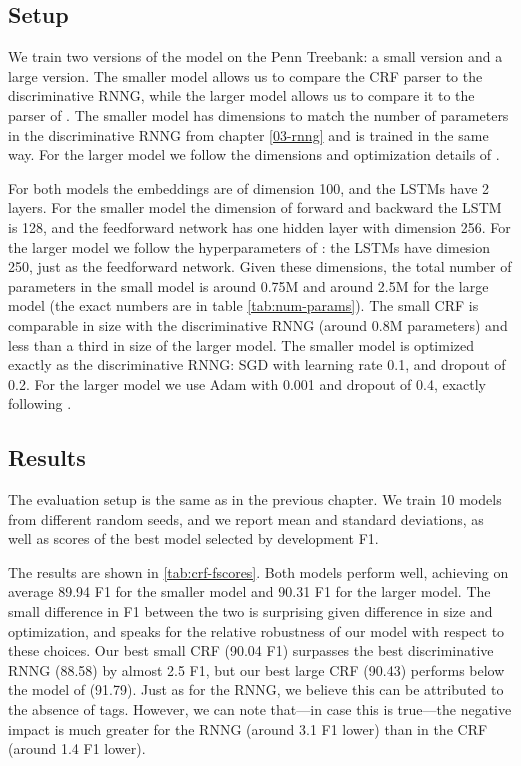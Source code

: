  \subsection{Setup}
    We train two versions of the model on the Penn Treebank: a small version and a large version. The smaller model allows us to compare the CRF parser to the discriminative RNNG, while the larger model allows us to compare it to the parser of \citet{stern2017minimal}. The smaller model has dimensions to match the number of parameters in the discriminative RNNG from chapter \ref{03-rnng} and is trained in the same way. For the larger model we follow the dimensions and optimization details of \citet{stern2017minimal}.

    For both models the embeddings are of dimension 100, and the LSTMs have 2 layers. For the smaller model the dimension of forward and backward the LSTM is 128, and the feedforward network has one hidden layer with dimension 256. For the larger model we follow the hyperparameters of \citet{stern2017minimal}: the LSTMs have dimesion 250, just as the feedforward network. Given these dimensions, the total number of parameters in the small model is around 0.75M and around 2.5M for the large model (the exact numbers are in table \ref{tab:num-params}). The small CRF is comparable in size with the discriminative RNNG (around 0.8M parameters) and less than a third in size of the larger model. The smaller model is optimized exactly as the discriminative RNNG: SGD with learning rate 0.1, and dropout of 0.2. For the larger model we use Adam \citep{kingma2014adam} with 0.001 and dropout of 0.4, exactly following \citet{stern2017minimal}.

  \subsection{Results}
    The evaluation setup is the same as in the previous chapter. We train 10 models from different random seeds, and we report mean and standard deviations, as well as scores of the best model selected by development F1.

    

    The results are shown in \ref{tab:crf-fscores}. Both models perform well, achieving on average 89.94 F1 for the smaller model and 90.31 F1 for the larger model. The small difference in F1 between the two is surprising given difference in size and optimization, and speaks for the relative robustness of our model with respect to these choices. Our best small CRF (90.04 F1) surpasses the best discriminative RNNG (88.58) by almost 2.5 F1, but our best large CRF (90.43) performs below the model of \citet{stern2017minimal} (91.79). Just as for the RNNG, we believe this can be attributed to the absence of tags. However, we can note that---in case this is true---the negative impact is much greater for the RNNG (around 3.1 F1 lower) than in the CRF (around 1.4 F1 lower).

